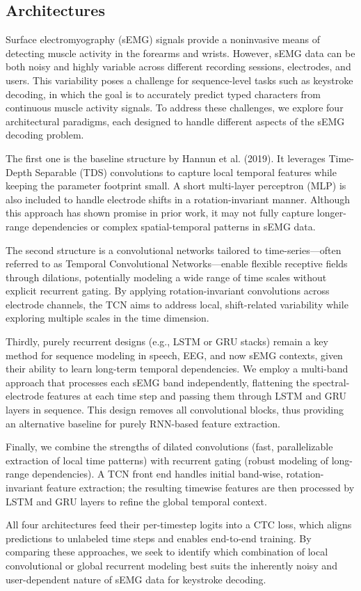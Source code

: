 \subsection{Architectures}

Surface electromyography (sEMG) signals provide a noninvasive means of detecting muscle activity in the forearms and wrists. However, sEMG data can be both noisy and highly variable across different recording sessions, electrodes, and users. This variability poses a challenge for sequence-level tasks such as keystroke decoding, in which the goal is to accurately predict typed characters from continuous muscle activity signals. To address these challenges, we explore four architectural paradigms, each designed to handle different aspects of the sEMG decoding problem.

The first one is the baseline structure by Hannun et al. (2019). It leverages Time-Depth Separable (TDS) convolutions to capture local temporal features while keeping the parameter footprint small. A short multi-layer perceptron (MLP) is also included to handle electrode shifts in a rotation-invariant manner. Although this approach has shown promise in prior work, it may not fully capture longer-range dependencies or complex spatial-temporal patterns in sEMG data.

The second structure is a convolutional networks tailored to time-series—often referred to as Temporal Convolutional Networks—enable flexible receptive fields through dilations, potentially modeling a wide range of time scales without explicit recurrent gating. By applying rotation-invariant convolutions across electrode channels, the TCN aims to address local, shift-related variability while exploring multiple scales in the time dimension.

Thirdly, purely recurrent designs (e.g., LSTM or GRU stacks) remain a key method for sequence modeling in speech, EEG, and now sEMG contexts, given their ability to learn long-term temporal dependencies. We employ a multi-band approach that processes each sEMG band independently, flattening the spectral-electrode features at each time step and passing them through LSTM and GRU layers in sequence. This design removes all convolutional blocks, thus providing an alternative baseline for purely RNN-based feature extraction.

Finally, we combine the strengths of dilated convolutions (fast, parallelizable extraction of local time patterns) with recurrent gating (robust modeling of long-range dependencies). A TCN front end handles initial band-wise, rotation-invariant feature extraction; the resulting timewise features are then processed by LSTM and GRU layers to refine the global temporal context.

All four architectures feed their per-timestep logits into a CTC loss, which aligns predictions to unlabeled time steps and enables end-to-end training. By comparing these approaches, we seek to identify which combination of local convolutional or global recurrent modeling best suits the inherently noisy and user-dependent nature of sEMG data for keystroke decoding.
